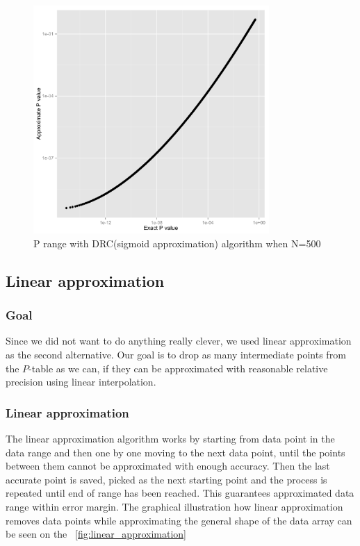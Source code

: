 \documentclass[12pt]{article}
\begin{document}
{\begin{figure}[H]
  \centering
  \includegraphics[width=0.8\textwidth]{PvsP50}
  \caption{P range with DRC(sigmoid approximation) algorithm when N=500}
  \label{fig:PdivPapproxDrcWhenN500}
\end{figure}

\subsection{Linear approximation}

\subsubsection{Goal}

Since we did not want to do anything really clever, we used linear approximation as the second alternative. Our goal is to drop as many intermediate points from the $P$-table as we can, if they can be approximated with reasonable relative precision using linear interpolation.

\subsubsection{Linear approximation}
The linear approximation algorithm works by starting from data point in the data range and then one by one moving to the next data point, until the points between them cannot be approximated with enough accuracy. Then the last accurate point is saved, picked as the next starting point and the process is repeated until end of range has been reached. This guarantees approximated data range within error margin. The graphical illustration how linear approximation removes data points while approximating the general shape of the data array can be seen on the ~\ref{fig:linear_approximation}

}
\end{document}
